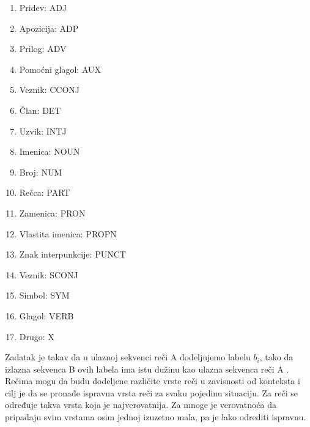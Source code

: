 \documentclass[12pt,oneside]{memoir}
\begin{document}
\begin{enumerate}
\item Pridev: ADJ
\item Apozicija: ADP
\item Prilog: ADV
\item Pomoćni glagol: AUX
\item Veznik: CCONJ
\item Član: DET
\item Uzvik: INTJ
\item Imenica: NOUN
\item Broj: NUM
\item Rečca: PART
\item Zamenica: PRON
\item Vlastita imenica: PROPN
\item Znak interpunkcije: PUNCT
\item Veznik: SCONJ
\item Simbol: SYM
\item Glagol: VERB
\item Drugo: X
\end{enumerate}

Zadatak je takav da u ulaznoj sekvenci reči A dodeljujemo labelu $b_i$, tako da izlazna sekvenca B ovih labela ima istu dužinu kao ulazna sekvenca reči A \cite{postagging}. Rečima mogu da budu dodeljene različite vrste reči u zavisnosti od konteksta i cilj je da se pronađe ispravna vrsta reči za svaku pojedinu situaciju. Za reči se određuje takva vrsta koja je najverovatnija. Za mnoge je verovatnoća da pripadaju svim vrstama osim jednoj izuzetno mala, pa je lako odrediti ispravnu.
\end{document}

